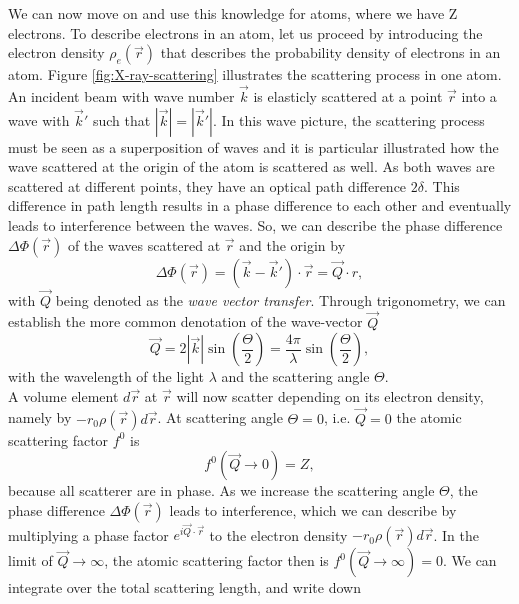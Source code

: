 We can now move on and use this knowledge for atoms, where we have Z electrons. To describe electrons in an atom, let us proceed by introducing the electron density $\rho_{e}\left(\vec{r}\right)$ that describes the probability density of electrons in an atom. Figure \ref{fig:X-ray-scattering} illustrates the scattering process in one atom. An incident beam with wave number $\vec{k}$ is elasticly scattered at a point $\vec{r}$ into a wave with $\vec{k}'$ such that $\left|\vec{k}\right|=\left|\vec{k}'\right|$. In this wave picture, the scattering process must be seen as a superposition of waves and it is particular illustrated how the wave scattered at the origin of the atom is scattered as well. As both waves are scattered at different points, they have an optical path difference $2 \delta$. This difference in path length results in a phase difference to each other and eventually leads to interference between the waves. So, we can describe the phase difference $\Delta \Phi\left(\vec{r}\right)$ of the waves scattered at $\vec{r}$ and the origin by
\begin{equation}
\Delta \Phi\left(\vec{r}\right) = \left(\vec{k}-\vec{k}'\right)\cdot \vec{r} = \vec{Q} \cdot r,
\label{eq:phase-difference}
\end{equation}
with $\vec{Q}$ being denoted as the \textit{wave vector transfer}. Through trigonometry, we can establish the more common denotation of the wave-vector $\vec{Q}$
\begin{equation}
\vec{Q}=2 \left|\vec{k}\right| \sin\left(\frac{\Theta}{2}\right)=\frac{4 \pi}{\lambda}\sin\left(\frac{\Theta}{2}\right),
\label{eq:Q-scattering-angle}
\end{equation}
with the wavelength of the light $\lambda$ and the scattering angle $\Theta$.\\
A volume element $d\vec{r}$ at $\vec{r}$ will now scatter depending on its electron density, namely by $-r_{0}\rho\left(\vec{r}\right)d\vec{r}$. At scattering angle $\Theta=0$, i.e. $\vec{Q}=0$ the atomic scattering factor $f^{0}$ is
\begin{equation}
f^{0}\left(\vec{Q}\rightarrow 0\right)=Z,
\label{eq:transform-number-of-particles}
\end{equation}
because all scatterer are in phase. As we increase the scattering angle $\Theta$, the phase difference $\Delta \Phi\left(\vec{r}\right)$ leads to interference, which we can describe by multiplying a phase factor $e^{i \vec{Q}\cdot \vec{r}}$ to the electron density $-r_{0}\rho\left(\vec{r}\right)d\vec{r}$. In the limit of $\vec{Q}\rightarrow\infty$, the atomic scattering factor then is $f^{0}\left(\vec{Q}\rightarrow\infty\right)=0$. We can integrate over the total scattering length, and write down
